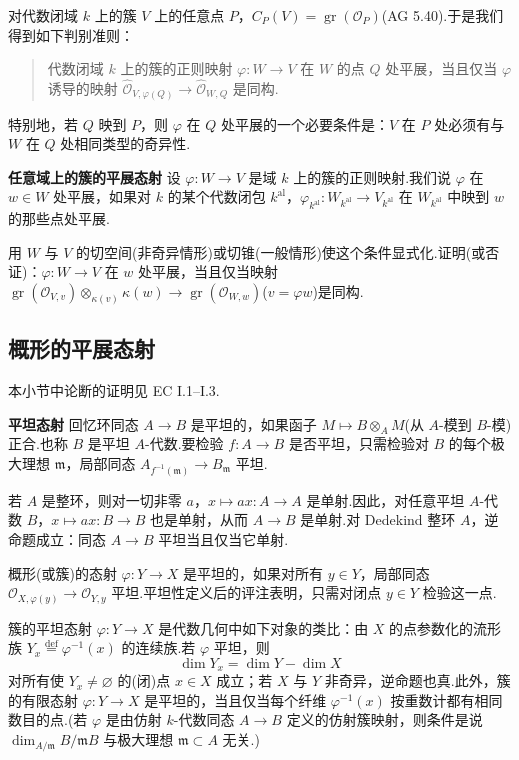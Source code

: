 对代数闭域 $k$ 上的簇 $V$ 上的任意点 $P$，$C_{P}(V) = \operatorname{gr}(\mathcal{O}_{P})$(AG 5.40).于是我们得到如下判别准则：

\begin{quote}
代数闭域 $k$ 上的簇的正则映射 $\varphi \colon W \to V$ 在 $W$ 的点 $Q$ 处平展，当且仅当 $\varphi$ 诱导的映射 $\widehat{\mathcal{O}}_{V, \varphi(Q)} \to \widehat{\mathcal{O}}_{W, Q}$ 是同构.
\end{quote}

特别地，若 $Q$ 映到 $P$，则 $\varphi$ 在 $Q$ 处平展的一个必要条件是：$V$ 在 $P$ 处必须有与 $W$ 在 $Q$ 处相同类型的奇异性.

\textbf{任意域上的簇的平展态射} 设 $\varphi \colon W \to V$ 是域 $k$ 上的簇的正则映射.我们说 $\varphi$ 在 $w \in W$ 处平展，如果对 $k$ 的某个代数闭包 $k^{\mathrm{al}}$，$\varphi_{k^{\mathrm{al}}} \colon W_{k^{\mathrm{al}}} \to V_{k^{\mathrm{al}}}$ 在 $W_{k^{\mathrm{al}}}$ 中映到 $w$ 的那些点处平展.

\begin{exercise}\label{exc:2.8}
用 $W$ 与 $V$ 的切空间(非奇异情形)或切锥(一般情形)使这个条件显式化.证明(或否证)：$\varphi \colon W \to V$ 在 $w$ 处平展，当且仅当映射 $\operatorname{gr}(\mathcal{O}_{V, v}) \otimes_{\kappa(v)} \kappa(w) \to \operatorname{gr}(\mathcal{O}_{W, w})$($v = \varphi w$)是同构.
\end{exercise}

\subsection*{概形的平展态射}

本小节中论断的证明见 EC I.1--I.3.

\textbf{平坦态射} 回忆环同态 $A \to B$ 是平坦的，如果函子 $M \mapsto B \otimes_{A} M$(从 $A$-模到 $B$-模)正合.也称 $B$ 是平坦 $A$-代数.要检验 $f \colon A \to B$ 是否平坦，只需检验对 $B$ 的每个极大理想 $\mathfrak{m}$，局部同态 $A_{f^{-1}(\mathfrak{m})} \to B_{\mathfrak{m}}$ 平坦.

若 $A$ 是整环，则对一切非零 $a$，$x \mapsto ax \colon A \to A$ 是单射.因此，对任意平坦 $A$-代数 $B$，$x \mapsto ax \colon B \to B$ 也是单射，从而 $A \to B$ 是单射.对 Dedekind 整环 $A$，逆命题成立：同态 $A \to B$ 平坦当且仅当它单射.

概形(或簇)的态射 $\varphi \colon Y \to X$ 是平坦的，如果对所有 $y \in Y$，局部同态 $\mathcal{O}_{X, \varphi(y)} \to \mathcal{O}_{Y, y}$ 平坦.平坦性定义后的评注表明，只需对闭点 $y \in Y$ 检验这一点.

簇的平坦态射 $\varphi \colon Y \to X$ 是代数几何中如下对象的类比：由 $X$ 的点参数化的流形族 $Y_x \overset{\mathrm{def}}{=} \varphi^{-1}(x)$ 的连续族.若 $\varphi$ 平坦，则
\[
\dim Y_x = \dim Y - \dim X
\]
对所有使 $Y_x \neq \varnothing$ 的(闭)点 $x \in X$ 成立；若 $X$ 与 $Y$ 非奇异，逆命题也真.此外，簇的有限态射 $\varphi \colon Y \to X$ 是平坦的，当且仅当每个纤维 $\varphi^{-1}(x)$ 按重数计都有相同数目的点.(若 $\varphi$ 是由仿射 $k$-代数同态 $A \to B$ 定义的仿射簇映射，则条件是说 $\dim_{A/\mathfrak{m}} B/\mathfrak{m}B$ 与极大理想 $\mathfrak{m} \subset A$ 无关.)

